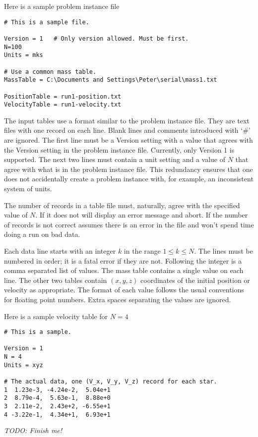 Here is a sample problem instance file
\begin{verbatim}
# This is a sample file.

Version = 1   # Only version allowed. Must be first.
N=100
Units = mks

# Use a common mass table.
MassTable = C:\Documents and Settings\Peter\serial\mass1.txt

PositionTable = run1-position.txt
VelocityTable = run1-velocity.txt
\end{verbatim}

The input tables use a format similar to the problem instance file. They are text files with one
record on each line. Blank lines and comments introduced with `\#' are ignored. The first line
must be a Version setting with a value that agrees with the Version setting in the problem
instance file. Currently, only Version 1 is supported. The next two lines must contain a unit
setting and a value of $N$ that agree with what is in the problem instance file. This redundancy
ensures that one does not accidentally create a problem instance with, for example, an
inconsistent system of units.

The number of records in a table file must, naturally, agree with the specified value of $N$. If
it does not  will display an error message and abort. If the number of records
is not correct  assumes there is an error in the file and won't spend time
doing a run on bad data.

Each data line starts with an integer $k$ in the range $1 \le k \le N$. The lines must be
numbered in order; it is a fatal error if they are not. Following the integer is a comma
separated list of values. The mass table contains a single value on each line. The other two
tables contain $(x, y, z)$ coordinates of the initial position or velocity as appropriate. The
format of each value follows the usual conventions for floating point numbers. Extra spaces
separating the values are ignored.

Here is a sample velocity table for $N=4$
\begin{verbatim}
# This is a sample.

Version = 1
N = 4
Units = xyz

# The actual data, one (V_x, V_y, V_z) record for each star.
1  1.23e-3, -4.24e-2,  5.04e+1
2  8.79e-4,  5.63e-1,  8.88e+0
3  2.11e-2,  2.43e+2, -6.55e+1
4 -3.22e-1,  4.34e+1,  6.93e+1
\end{verbatim}

\textit{TODO: Finish me!}
